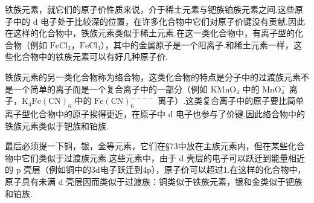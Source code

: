 铁族元素，就它们的原子价性质来说，介于稀土元素与钯族铂族元素之间.这些原子中的 d 电子处于比较深的位置，在许多化合物中它们对原子价键没有贡献.因此在这样的化合物中，铁族元素类似于稀土元素.在这一类化合物中，有离子型的化合物（例如 $\mathrm{FeCl}_2$，$\mathrm{FeCl}_3$），其中的金属原子是一个阳离子.和稀土元素一样，这些化合物中的铁族元素可以有好几种原子价.

铁族元素的另一类化合物称为络合物，这类化合物的特点是分子中的过渡族元素不是一个简单的离子而是一个复合离子中的一部分（例如 $\mathrm{KMnO}_4$ 中的 $\mathrm{MnO}_4^-$ 离子，$\mathrm{K}_4\mathrm{Fe}(\mathrm{CN})_6$ 中的 $\mathrm{Fe}(\mathrm{CN})_6^{----}$ 离子）.这类复合离子中的原子要比简单离子型化合物中的原子挨得更近，在原子中 d 电子也参与了价键.因此络合物中的铁族元素类似于钯族和铂族.

最后必须提一下铜，银，金等元素，它们在§73中放在主族元素内，但在某些化合物中它们类似于过渡族元素.这些元素中，由于 d 壳层的电子可以跃迁到能量相近的 p 壳层（例如铜中的3d电子跃迁到4p），原子价可以超过1.在这样的化合物中，原子具有未满 d 壳层因而类似于过渡族：铜类似于铁族元素，银和金类似于钯族和铂族.

